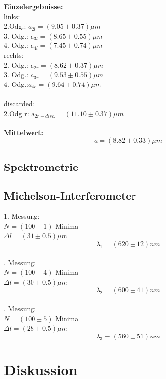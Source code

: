 \documentclass[12pt,a4paper]{article}
\begin{document}
\begin{multicols}{2}
\textbf{Einzelergebnisse:}\\
links:\\
2.Odg.: $a_{2l}=(9.05\pm 0.37) \mu m$\\
3. Odg.: $a_{3l}=(8.65 \pm 0.55) \mu m$\\
4. Odg.: $a_{4l}=(7.45\pm 0.74)\mu m$\\
rechts:\\
2. Odg.: $a_{2r}=(8.62\pm 0.37)\mu m$\\
3. Odg.: $a_{3r}=(9.53\pm 0.55) \mu m$\\
4. Odg.:$a_{4r}=(9.64 \pm 0.74) \mu m$\\
\\
discarded:\\
2.Odg r: $a_{2r-disc.}=(11.10 \pm 0.37)\mu m$\\
\\
\textbf{Mittelwert:}\\
$$a=(8.82 \pm 0.33)\mu m$$




\subsection{Spektrometrie}


\subsection{Michelson-Interferometer}

1. Messung:\\
$N = (100 \pm 1)$ Minima\\
$\Delta l = (31\pm 0.5)\mu m$\\
$$\lambda_1=(620\pm 12)nm$$\\

. Messung:\\
$N=(100 \pm 4)$ Minima\\
$\Delta l = (30 \pm 0.5) \mu m$\\
$$\lambda_2 =(600\pm 41)nm$$\\

. Messung:\\
$N =(100 \pm 5)$ Minima\\
$\Delta l = (28 \pm 0.5)\mu m$\\
$$\lambda_3 = (560\pm 51) nm$$


\section{Diskussion}

\end{multicols}
\end{document}
